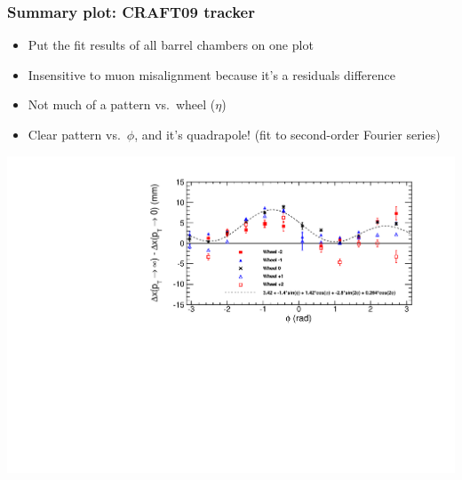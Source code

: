 \documentclass[compress]{beamer}
\begin{document}
\begin{frame}
\frametitle{Summary plot: CRAFT09 tracker}

\begin{itemize}
\item Put the fit results of all barrel chambers on one plot
\item Insensitive to muon misalignment because it's a residuals difference
\item Not much of a pattern vs.\ wheel ($\eta$)
\item Clear pattern vs.\ $\phi$, and it's quadrapole!  (fit to second-order Fourier series)
\end{itemize}

\includegraphics[width=\linewidth]{summary.pdf}
\end{frame}
\end{document}
